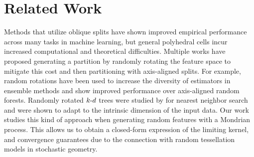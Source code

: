 \section{Related Work}
Methods that utilize oblique splits have shown improved empirical performance across many tasks in machine learning, but general polyhedral cells incur increased computational and theoretical difficulties. Multiple works have proposed generating a partition by randomly rotating the feature space to mitigate this cost and then partitioning with axis-aligned splits. For example, random rotations have been used to increase the diversity of estimators in ensemble methods \citep{blaser2016random} and show improved performance over axis-aligned random forests. Randomly rotated $k{\text -}d$ trees were studied by \cite{vempala:LIPIcs:2012:3847} for nearest neighbor search and were shown to adapt to the intrinsic dimension of the input data. Our work studies this kind of approach when generating random features with a Mondrian process. This allows us to obtain a closed-form expression of the limiting kernel, and convergence guarantees due to the connection with random tessellation models in stochastic geometry.